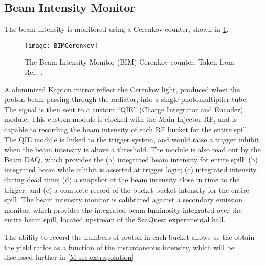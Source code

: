 \documentclass[../main.tex]{subfiles}
\begin{document}
\subsection{Beam Intensity Monitor}
The beam intensity is monitored using a Cerenkov counter, shown in \cref{fig:BIM}.
\begin{figure}[htbp!]
	\centering
	\texttt{[image: BIMCerenkov]}
	\caption{The Beam Intensity Monitor (BIM) Cerenkov counter. Taken from Ref.\
		\cite{aidala2019}.}
	\label{fig:BIM}
\end{figure}
A aluminized Kapton mirror reflect the Cerenkov light, produced when the proton beam
passing through the radiator, into a single photomultiplier tube. The signal is then
sent to a custom ``QIE'' (Charge Integrator and Encoder) module. This custom module
is clocked with the Main Injector RF, and is capable to recording the beam intensity
of each RF bucket for the entire spill. The QIE module is linked to the trigger
system, and would raise a trigger inhibit when the beam intensity is above a
threshold. The module is also read out by the Beam DAQ, which provides the (a)
integrated beam intensity for entire spill; (b) integrated beam while inhibit is
asserted at trigger logic; (c) integrated intensity during dead time; (d) a snapshot
of the beam intensity close in time to the trigger; and (e) a complete record of the
bucket-bucket intensity for the entire spill. The beam intensity monitor is calibrated
against a secondary emission monitor, which provides the integrated beam luminosity
integrated over the entire beam spill, located upstream of the SeaQuest experimental hall.

The ability to record the numbers of proton in each bucket allows us the obtain the
yield ratios as a function of the instantaneous intensity, which will be discussed
further in \cref{M-sec:extrapolation}
\end{document}
